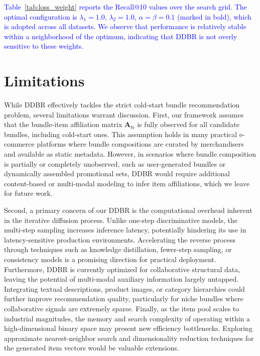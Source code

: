 \documentclass[lettersize,journal]{IEEEtran}
\newcommand{\revise}[1]{\textcolor{blue}{#1}}
\begin{document}
\revise{Table~\ref{tab:loss_weight} reports the Recall@10 values over the search grid. The optimal configuration is $\lambda_1=1.0$, $\lambda_2=1.0$, $\alpha=\beta=0.1$ (marked in bold), which is adopted across all datasets. We observe that performance is relatively stable within a neighborhood of the optimum, indicating that DDBR is not overly sensitive to these weights.}

\section{Limitations}
\label{sec:limitations}
While DDBR effectively tackles the strict cold-start bundle recommendation problem, several limitations warrant discussion. First, our framework assumes that the bundle-item affiliation matrix $\mathbf{A}_{bi}$ is fully observed for all candidate bundles, including cold-start ones. This assumption holds in many practical e-commerce platforms where bundle compositions are curated by merchandisers and available as static metadata. However, in scenarios where bundle composition is partially or completely unobserved, such as user-generated bundles or dynamically assembled promotional sets, DDBR would require additional content-based or multi-modal modeling to infer item affiliations, which we leave for future work.

Second, a primary concern of our DDBR is the computational overhead inherent in the iterative diffusion process. Unlike one-step discriminative models, the multi-step sampling increases inference latency, potentially hindering its use in latency-sensitive production environments. Accelerating the reverse process through techniques such as knowledge distillation, fewer-step sampling, or consistency models is a promising direction for practical deployment. Furthermore, DDBR is currently optimized for collaborative structural data, leaving the potential of multi-modal auxiliary information largely untapped. Integrating textual descriptions, product images, or category hierarchies could further improve recommendation quality, particularly for niche bundles where collaborative signals are extremely sparse. Finally, as the item pool scales to industrial magnitudes, the memory and search complexity of operating within a high-dimensional binary space may present new efficiency bottlenecks. Exploring approximate nearest-neighbor search and dimensionality reduction techniques for the generated item vectors would be valuable extensions.
\end{document}
